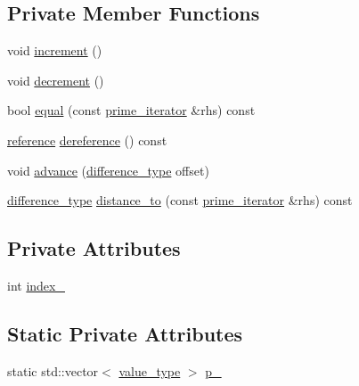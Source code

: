 \subsection*{\-Private \-Member \-Functions}
\begin{DoxyCompactItemize}
\item 
void \hyperlink{classyuh_1_1range__detail_1_1prime__iterator_aeb2624c7a86b765725fd80cd426e147d}{increment} ()
\item 
void \hyperlink{classyuh_1_1range__detail_1_1prime__iterator_af998f1201f6ff5160003144e5818b8ba}{decrement} ()
\item 
bool \hyperlink{classyuh_1_1range__detail_1_1prime__iterator_ad971c0d6ccb1edb1b7753d099376cc67}{equal} (const \hyperlink{classyuh_1_1range__detail_1_1prime__iterator}{prime\-\_\-iterator} \&rhs) const 
\item 
\hyperlink{classyuh_1_1range__detail_1_1prime__iterator_ad1e39b66edf20cbb5c89ccb28ff834b6}{reference} \hyperlink{classyuh_1_1range__detail_1_1prime__iterator_a41a5655b05004c0e8e527af93d08d2a3}{dereference} () const 
\item 
void \hyperlink{classyuh_1_1range__detail_1_1prime__iterator_a0b477ad04db9bc38c85d68245b9886e5}{advance} (\hyperlink{classyuh_1_1range__detail_1_1prime__iterator_a18e7411e8bb12bf0d225a2ed55ce31c8}{difference\-\_\-type} offset)
\item 
\hyperlink{classyuh_1_1range__detail_1_1prime__iterator_a18e7411e8bb12bf0d225a2ed55ce31c8}{difference\-\_\-type} \hyperlink{classyuh_1_1range__detail_1_1prime__iterator_a4510fc76b72f1340fb6cf787d3eafe72}{distance\-\_\-to} (const \hyperlink{classyuh_1_1range__detail_1_1prime__iterator}{prime\-\_\-iterator} \&rhs) const 
\end{DoxyCompactItemize}
\subsection*{\-Private \-Attributes}
\begin{DoxyCompactItemize}
\item 
int \hyperlink{classyuh_1_1range__detail_1_1prime__iterator_aaaf1ac02dfa554a3cdffc647d512a77b}{index\-\_\-}
\end{DoxyCompactItemize}
\subsection*{\-Static \-Private \-Attributes}
\begin{DoxyCompactItemize}
\item 
static std\-::vector$<$ \hyperlink{classyuh_1_1range__detail_1_1prime__iterator_aaa801ea9fe09398ea8c5beb1324edadf}{value\-\_\-type} $>$ \hyperlink{classyuh_1_1range__detail_1_1prime__iterator_aff6d0a0fbc14123c0fca5a0c05d2e68c}{p\-\_\-}
\end{DoxyCompactItemize}
